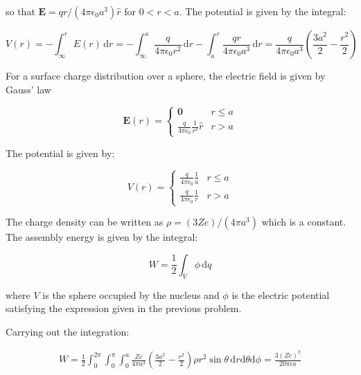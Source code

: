 \documentclass[12pt]{article}
\begin{document}
so that $\mathbf{E} = qr/(4\pi \epsilon_{0} a^{3}) \hat{r}$ for $0 < r < a$. The potential is given by the integral:

\begin{equation}
    V(r) = -\int_{\infty}^{r} E(r) \, \mathrm{d}r = -\int_{\infty}^{a} \frac{q}{4\pi \epsilon_{0} r^{2}} \, \mathrm{d}r - \int_{a}^{r} \frac{qr}{4\pi \epsilon_{0} a^{3}} \, \mathrm{d}r = \frac{q}{4\pi \epsilon_{0} a^{3}} \left( \frac{3a^{2}}{2} - \frac{r^{2}}{2} \right)
\end{equation}

For a surface charge distribution over a sphere, the electric field is given by Gauss' law

\begin{equation}
    \mathbf{E}(r) =
    \begin{cases}
        \mathbf{0} & r \le a \\
        \frac{q}{4\pi \epsilon_{0}} \frac{1}{r^{2}} \hat{r} & r > a
    \end{cases}
\end{equation}

The potential is given by:

\begin{equation}
    V(r) =
    \begin{cases}
        \frac{q}{4\pi \epsilon_{0}} \frac{1}{a} & r \le a \\
        \frac{q}{4\pi \epsilon_{0}} \frac{1}{r} & r > a
    \end{cases}
\end{equation}


The charge density can be written as $\rho = (3Ze)/(4\pi a^{3})$ which is a constant. The assembly energy is given by the integral:

\begin{equation}
    W = \frac{1}{2} \int_{V} \phi \, \mathrm{d}q
\end{equation}

where $V$ is the sphere occupied by the nucleus and $\phi$ is the electric potential satisfying the expression given in the previous problem.

Carrying out the integration:

\begin{equation}
\begin{split}
    W = \frac{1}{2} \int_{0}^{2\pi} \int_{0}^{\pi} \int_{0}^{a} \frac{Ze}{4\pi a^{3}} \left( \frac{3a^{2}}{2} - \frac{r^{2}}{2} \right) \rho r^{2} \sin{\theta} \, \mathrm{d}r \mathrm{d}\theta \mathrm{d}\phi = \frac{3 (Ze)^{2}}{20\pi \epsilon a}
\end{split}
\end{equation}
\end{document}
